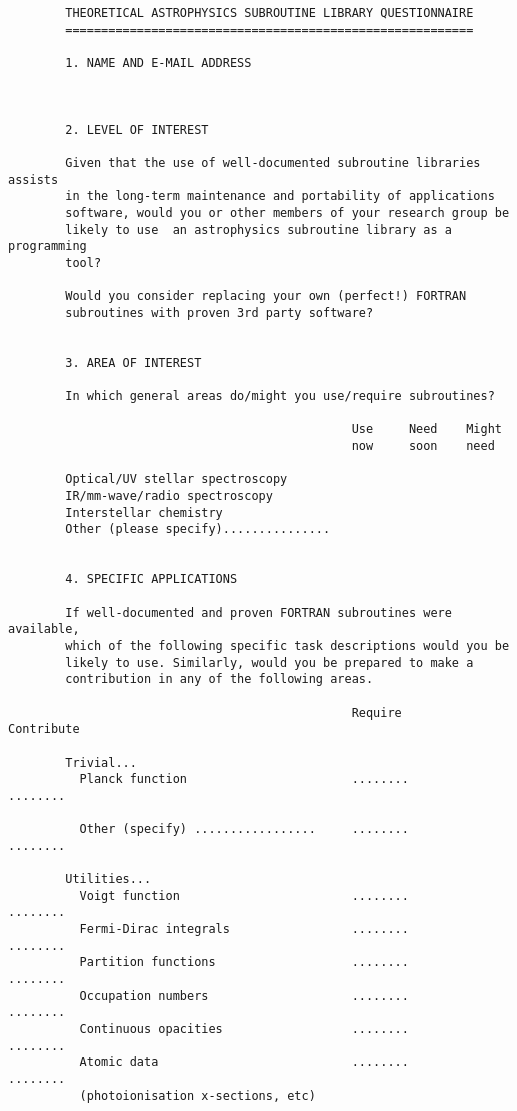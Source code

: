 \small
\begin{verbatim}
        THEORETICAL ASTROPHYSICS SUBROUTINE LIBRARY QUESTIONNAIRE
        =========================================================

        1. NAME AND E-MAIL ADDRESS



        2. LEVEL OF INTEREST

        Given that the use of well-documented subroutine libraries assists
        in the long-term maintenance and portability of applications
        software, would you or other members of your research group be
        likely to use  an astrophysics subroutine library as a programming
        tool?

        Would you consider replacing your own (perfect!) FORTRAN
        subroutines with proven 3rd party software?


        3. AREA OF INTEREST

        In which general areas do/might you use/require subroutines?

                                                Use     Need    Might
                                                now     soon    need

        Optical/UV stellar spectroscopy
        IR/mm-wave/radio spectroscopy
        Interstellar chemistry
        Other (please specify)...............


        4. SPECIFIC APPLICATIONS

        If well-documented and proven FORTRAN subroutines were available,
        which of the following specific task descriptions would you be
        likely to use. Similarly, would you be prepared to make a
        contribution in any of the following areas.

                                                Require         Contribute

        Trivial...
          Planck function                       ........        ........

          Other (specify) .................     ........        ........

        Utilities...
          Voigt function                        ........        ........
          Fermi-Dirac integrals                 ........        ........
          Partition functions                   ........        ........
          Occupation numbers                    ........        ........
          Continuous opacities                  ........        ........
          Atomic data                           ........        ........
          (photoionisation x-sections, etc)


\end{verbatim}
